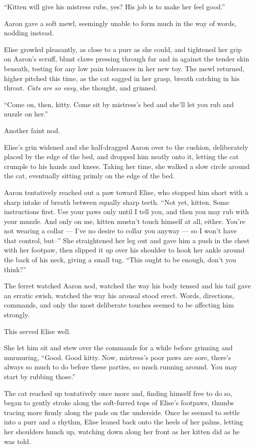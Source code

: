 ``Kitten will give his mistress rubs, yes? His job is to make her feel
good.''

Aaron gave a soft mewl, seemingly unable to form much in the way of
words, nodding instead.

Elise growled pleasantly, as close to a purr as she could, and tightened
her grip on Aaron's scruff, blunt claws pressing through fur and in
against the tender skin beneath, testing for any low pain tolerances in
her new toy. The mewl returned, higher pitched this time, as the cat
sagged in her grasp, breath catching in his throat. \emph{Cats are so
easy,} she thought, and grinned.

``Come on, then, kitty. Come sit by mistress's bed and she'll let you
rub and nuzzle on her.''

Another faint nod.

Elise's grin widened and she half-dragged Aaron over to the cushion,
deliberately placed by the edge of the bed, and dropped him neatly onto
it, letting the cat crumple to his hands and knees. Taking her time, she
walked a slow circle around the cat, eventually sitting primly on the
edge of the bed.

Aaron tentatively reached out a paw toward Elise, who stopped him short
with a sharp intake of breath between equally sharp teeth. ``Not yet,
kitten. Some instructions first. Use your paws only until I tell you,
and then you may rub with your muzzle. And only on me, kitten mustn't
touch himself at all, either. You're not wearing a collar --- I've no
desire to collar you anyway --- so I won't have that control, but--''
She straightened her leg out and gave him a push in the chest with her
footpaw, then slipped it up over his shoulder to hook her ankle around
the back of his neck, giving a small tug. ``This ought to be enough,
don't you think?''

The ferret watched Aaron nod, watched the way his body tensed and his
tail gave an erratic swish, watched the way his arousal stood erect.
Words, directions, commands, and only the most deliberate touches seemed
to be affecting him strongly.

This served Elise well.

She let him sit and stew over the commands for a while before grinning
and murmuring, ``Good. Good kitty. Now, mistress's poor paws are sore,
there's always so much to do before these parties, so much running
around. You may start by rubbing those.''

The cat reached up tentatively once more and, finding himself free to do
so, began to gently stroke along the soft-furred tops of Elise's
footpaws, thumbs tracing more firmly along the pads on the underside.
Once he seemed to settle into a purr and a rhythm, Elise leaned back
onto the heels of her palms, letting her shoulders hunch up, watching
down along her front as her kitten did as he was told.

